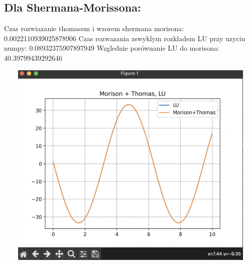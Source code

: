 \documentclass[12pt]{article}
\begin{document}
\subsection{Dla Shermana-Morissona:}
\begin{center}
    Czas rozwiazanie thomasem i wzorem shermana morisona: 0.0022110939025878906
\newline\newline
    Czas rozwazania zswyklym rozkladem LU przy uzyciu numpy: 0.08932375907897949
    \newline\newline
    Wzglednie porównanie LU do morisona: 40.39799439292646
\end{center}
\includegraphics[width=15cm,height=10cm, keepaspectratio]{wykres_sherman}
\end{document}
